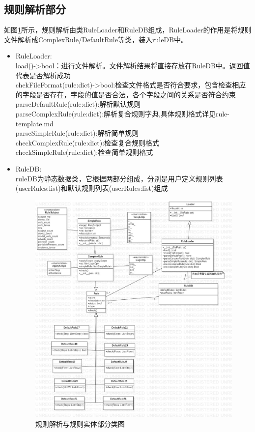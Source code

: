     \subsection{规则解析部分}
   		如图\ref{classDiagram_rule}所示，规则解析由类RuleLoader和RuleDB组成，RuleLoader的作用是将规则文件解析成ComplexRule/DefaultRule等类，装入ruleDB中。\\
    \begin{itemize}
    	

    	\item 	RuleLoader:\\
    	load()->bool：进行文件解析。文件解析结果将直接存放在RuleDB中。返回值代表是否解析成功\\
    	chekFileFormat(rule:dict)->bool:检查文件格式是否符合要求，包含检查相应的字段是否存在，字段的值是否合法，各个字段之间的关系是否符合约束\\
    	parseDefaultRule(rule:dict):解析默认规则\\
    	parseComplexRule(rule:dict):解析复合规则字典,具体规则格式详见rule-template.md\\
    	parseSimpleRule(rule:dict):解析简单规则\\
    	checkComplexRule(rule:dict):检查复合规则格式\\
    	checkSimpleRule(rule:dict):检查简单规则格式
    	\item 	RuleDB:\\
    	ruleDB为静态数据类，它根据两部分组成，分别是用户定义规则列表(userRules:list)和默认规则列表(userRules:list)组成\\
    	\begin{figure}
    		\centering
    		\includegraphics[width=1\textwidth]{src/classDiagram_rule.jpg} 
			\caption{规则解析与规则实体部分类图} 
			\label{classDiagram_rule}
    	\end{figure}
    \end{itemize}
